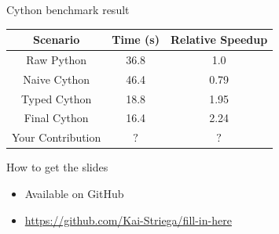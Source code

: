 \documentclass[12pt,xcolor=dvipsnames]{beamer}
\begin{document}
    \begin{frame}{Cython benchmark result}
        \begin{center}
        \begin{tabular}{ | c | c | c | }
            \hline
            Scenario & Time (s) & Relative Speedup \\
            \hline
            Raw Python & 36.8 & 1.0 \\
            Naive Cython & 46.4 & 0.79 \\
            Typed Cython & 18.8 & 1.95 \\
            Final Cython & 16.4 & 2.24 \\
            Your Contribution & $?$ & $?$ \\
            \hline
        \end{tabular}
        \end{center}
    \end{frame}

    \begin{frame}{How to get the slides}
        \begin{itemize}
            \item Available on GitHub
            \item \url{https://github.com/Kai-Striega/fill-in-here}
        \end{itemize}
    \end{frame}
\end{document}
